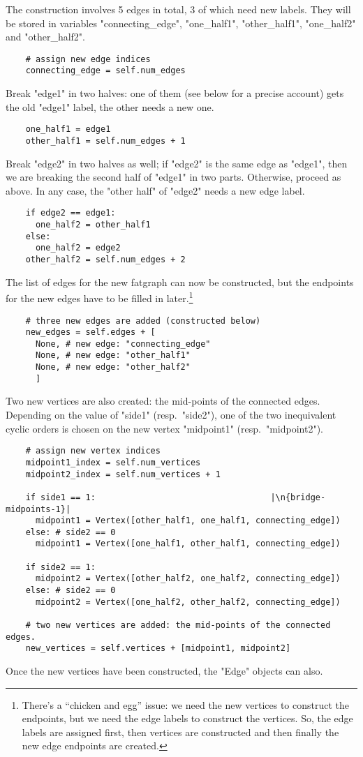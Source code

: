 The construction involves 5 edges in total, 3 of which need new
labels. They will be stored in variables "connecting_edge",
"one_half1", "other_half1", "one_half2" and "other_half2".
\begin{lstlisting}
    # assign new edge indices
    connecting_edge = self.num_edges
\end{lstlisting}
Break "edge1" in two halves: one of them (see below for a precise
account) gets the old "edge1" label, the other needs a new one.
\begin{lstlisting}
    one_half1 = edge1
    other_half1 = self.num_edges + 1
\end{lstlisting}
Break "edge2" in two halves as well; if "edge2" is the same edge as
"edge1", then we are breaking the second half of "edge1" in
two parts.  Otherwise, proceed as above.  In any case, the
"other half" of "edge2" needs a new edge label.
\begin{lstlisting}
    if edge2 == edge1:
      one_half2 = other_half1
    else:
      one_half2 = edge2
    other_half2 = self.num_edges + 2

\end{lstlisting}
The list of edges for the new fatgraph can now be constructed, but the
endpoints for the new edges have to be filled in
later.\footnote{There's a ``chicken and egg'' issue: we need the
  new vertices to construct the endpoints, but we need the edge labels
  to construct the vertices.  So, the edge labels are assigned first,
  then vertices are constructed and then finally the new edge
  endpoints are created.\label{fn:chicken-and-egg}}
\begin{lstlisting}
    # three new edges are added (constructed below)
    new_edges = self.edges + [
      None, # new edge: "connecting_edge"
      None, # new edge: "other_half1"
      None, # new edge: "other_half2"
      ]
\end{lstlisting}

Two new vertices are also created: the mid-points of the connected
edges. Depending on the value of "side1" (resp.~"side2"), one of the
two inequivalent cyclic orders is chosen on the new vertex "midpoint1"
(resp.~"midpoint2").
\begin{lstlisting}
    # assign new vertex indices
    midpoint1_index = self.num_vertices
    midpoint2_index = self.num_vertices + 1

    if side1 == 1:                                   |\n{bridge-midpoints-1}|
      midpoint1 = Vertex([other_half1, one_half1, connecting_edge])
    else: # side2 == 0
      midpoint1 = Vertex([one_half1, other_half1, connecting_edge])

    if side2 == 1:
      midpoint2 = Vertex([other_half2, one_half2, connecting_edge])
    else: # side2 == 0
      midpoint2 = Vertex([one_half2, other_half2, connecting_edge])

    # two new vertices are added: the mid-points of the connected edges.
    new_vertices = self.vertices + [midpoint1, midpoint2]

\end{lstlisting}
Once the new vertices have been constructed, the "Edge" objects can
also.

